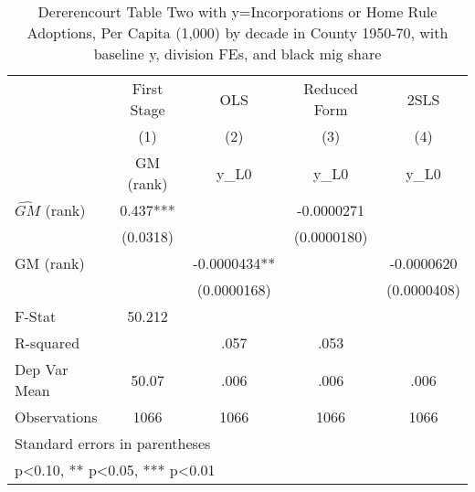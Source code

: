 \begin{table}[htbp]\centering
\def\sym#1{\ifmmode^{#1}\else\(^{#1}\)\fi}
\caption{Dererencourt Table Two with y=Incorporations or Home Rule Adoptions, Per Capita (1,000) by decade in County 1950-70, with baseline y, division FEs, and black mig share}
\begin{tabular}{l*{4}{c}}
\toprule
                    & First Stage   &         OLS   &Reduced Form   &        2SLS   \\
                    &\multicolumn{1}{c}{(1)}&\multicolumn{1}{c}{(2)}&\multicolumn{1}{c}{(3)}&\multicolumn{1}{c}{(4)}\\
                    &\multicolumn{1}{c}{GM  (rank)}&\multicolumn{1}{c}{y\_L0}&\multicolumn{1}{c}{y\_L0}&\multicolumn{1}{c}{y\_L0}\\
\midrule
$\hat{GM}$ (rank)   &       0.437***&               &  -0.0000271   &               \\
                    &    (0.0318)   &               & (0.0000180)   &               \\
\addlinespace
GM  (rank)          &               &  -0.0000434** &               &  -0.0000620   \\
                    &               & (0.0000168)   &               & (0.0000408)   \\
\midrule
F-Stat              &      50.212   &               &               &               \\
R-squared           &               &        .057   &        .053   &               \\
Dep Var Mean        &       50.07   &        .006   &        .006   &        .006   \\
Observations        &        1066   &        1066   &        1066   &        1066   \\
\bottomrule
\multicolumn{5}{l}{\footnotesize Standard errors in parentheses}\\
\multicolumn{5}{l}{\footnotesize * p<0.10, ** p<0.05, *** p<0.01}\\
\end{tabular}
\end{table}
